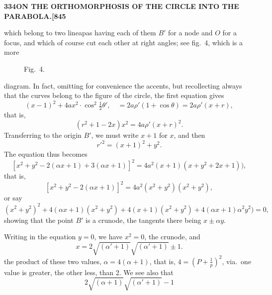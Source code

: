 \documentclass[12pt,a4paper]{article}
\theoremstyle{definition}
\begin{document}
\noindent\textbf{334}\hfill\textbf{ON THE ORTHOMORPHOSIS OF THE CIRCLE INTO THE PARABOLA.}\hfill\textbf{[845}

\bigskip

\noindent which belong to two lineapas having each of them $B'$ for a node and $O$ for a focus, and which of course cut each other at right angles; see fig.\ 4, which is a more

\begin{figure}[H]
\centering
{}
\caption*{Fig.~4.}
\end{figure}

diagram. In fact, omitting for convenience the accents, but recollecting always that the curves belong to the figure of the circle, the first equation gives
\[
(x - 1)^2 + 4ax^2 \cdot \cos^2\tfrac{1}{2}\theta', \quad = 2a\rho'(1 + \cos\theta) = 2a\rho'(x + r),
\]
that is,
\[
(r^2 + 1 - 2x)x^2 = 4a\rho'(x + r)^2.
\]
Transferring to the origin $B'$, we must write $x + 1$ for $x$, and then
\[
r'^2 = (x + 1)^2 + y^2.
\]
The equation thus becomes
\[
[x^2 + y^2 - 2(\alpha x + 1) + 3(\alpha x + 1)]^2 = 4a^2(x + 1)(x + y^2 + 2x + 1)),
\]
that is,
\[
[x^2 + y^2 - 2(\alpha x + 1)]^2 = 4a^2(x^2 + y^2)(x^2 + y^2),
\]
or say
\[
(x^2 + y^2)^2 + 4(\alpha x + 1)(x^2 + y^2) + 4(x + 1)(x^2 + y^2) + 4(\alpha x + 1)\alpha^2y^2) = 0,
\]
showing that the point $B'$ is a crunode, the tangents there being $x \pm \alpha y$.

Writing in the equation $y = 0$, we have $x^2 = 0$, the crunode, and
\[
x = 2\sqrt{(\alpha' + 1)}\sqrt{(\alpha' + 1)} \pm 1.
\]
the product of these two values, $\alpha = 4(\alpha + 1)$, that is, $4 = \left(P + \frac{1}{p}\right)^2$, via.\ one value is greater, the other less, than 2. We see also that
\[
2\sqrt{(\alpha + 1)}\sqrt{(\alpha' + 1)} - 1
\]
\end{document}
